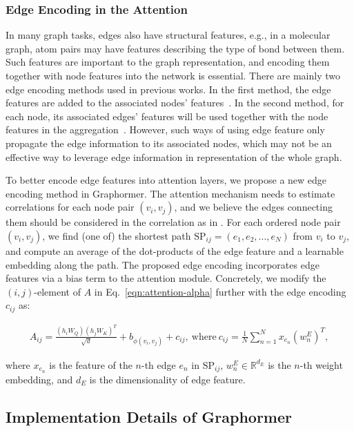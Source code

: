 \documentclass{article}
\begin{document}
\subsubsection{Edge Encoding in the Attention}\label{sec:edge}
In many graph tasks, edges also have structural features, e.g., in a molecular graph, atom pairs may have features describing the type of bond between them. Such features are important to the graph representation, and encoding them together with node features into the network is essential. There are mainly two edge encoding methods used in previous works. In the first method, the edge features are added to the associated nodes' features~\cite{hu2020open,li2020deepergcn}. In the second method, for each node, its associated edges' features will be used together with the node features in the aggregation~\cite{gilmer2017neural,xu2018how,kipf2016semi}. However, such ways of using edge feature only propagate the edge information to its associated nodes, which may not be an effective way to leverage edge information in representation of the whole graph.

To better encode edge features into attention layers, we propose a new edge encoding method in Graphormer. The attention mechanism needs to estimate correlations for each node pair $(v_i, v_j)$, and we believe the edges connecting them should be considered in the correlation as in \cite{lin2018multi, wang2020direct}. For each ordered node pair $(v_i, v_j)$, we find (one of) the shortest path $\text{SP}_{ij}=(e_1,e_2,...,e_N)$ from $v_i$ to $v_j$, and compute an average of the dot-products of the edge feature and a learnable embedding along the path. The proposed edge encoding incorporates edge features via a bias term to the attention module. Concretely, we modify the $(i,j)$-element of $A$ in Eq.~\eqref{eqn:attention-alpha} further with the edge encoding $c_{ij}$ as:

\begin{align}
    A_{ij}=\frac{(h_iW_{Q})(h_jW_{K})^T}{\sqrt{d}} + b_{\phi(v_i,v_j)} + c_{ij},\ \text{where}\ c_{ij}=\frac{1}{N}\sum_{n=1}^{N} x_{e_n}(w^{E}_{n})^T,
    \label{eqn:attn-edge}
\end{align}

where $x_{e_n}$ is the feature of the $n$-th edge $e_n$ in $\text{SP}_{ij}$, $w_n^{E}\in \mathbb{R}^{d_E}$ is the $n$-th weight embedding, and $d_E$ is the dimensionality of edge feature. 

\subsection{Implementation Details of Graphormer}\label{sec:model}
\end{document}
